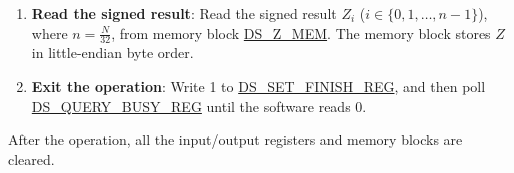 \documentclass[main\_\_EN.tex]{subfiles}
\begin{document}
\begin{enumerate}
\begin{itemize}
        \item If the value is 1, it indicates that the padding check passes but MD check fails. The signed result \begin{math}Z\end{math} is invalid. The operation will resume directly from Step \ref{other:digsig-step-exit}.
        
        \item If the value is 2, it indicates that the padding check fails but MD check passes. Users can continue to get the signed result \begin{math}Z\end{math}. But please note that the data does not comply with the aforementioned PKCS\#7 padding format, which may not be what you want.
        
        \item If the value is 3, it indicates that both padding check and MD check fail. In this case, some fatal errors have occurred and the signed result \begin{math}Z\end{math} is invalid. The operation will resume directly from Step \ref{other:digsig-step-exit}.
        
    \end{itemize}
        
    \item {\bfseries Read the signed result}: Read the signed result \begin{math}Z_{i}\end{math} (\begin{math}i \in \{0,1,\dots,n-1\}\end{math}), where \begin{math} n = \frac{N}{32} \end{math}, from memory block \hyperref[DSZMEM]{DS\_Z\_MEM}. The memory block stores \begin{math}Z\end{math} in little-endian byte order.
    
    \item {\bfseries Exit the operation\label{other:digsig-step-exit}}: Write 1 to \hyperref[regdesc:DSSETFINISHREG]{DS\_SET\_FINISH\_REG}, and then poll \hyperref[regdesc:DSQUERYBUSYREG]{DS\_QUERY\_BUSY\_REG} until the software reads 0.

\end{enumerate}

After the operation, all the input/output registers and memory blocks are cleared.
\end{document}
